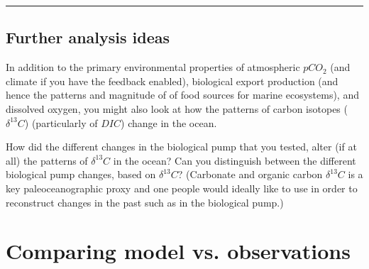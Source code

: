 \vspace{1mm} \noindent\rule{4cm}{0.5pt} \vspace{2mm}

\newpage

\subsection{Further analysis ideas}

\noindent In addition to the primary environmental properties of atmospheric \(pCO_{2}\) (and climate if you have the feedback enabled), biological export production (and hence the patterns and magnitude of of food sources for marine ecosystems), and dissolved oxygen, you might also look at how the patterns of carbon isotopes (\(\delta^{13}C\)) (particularly of \(DIC\)) change in the ocean. 

How did the different changes in the biological pump that you tested, alter (if at all) the patterns of \(\delta^{13}C\) in the ocean? Can you distinguish between the different biological pump changes, based on \(\delta^{13}C\)? (Carbonate and organic carbon \(\delta^{13}C\) is a key paleoceanographic proxy and one people would ideally like to use in order to reconstruct changes in the past such as in the biological pump.)

\newpage

\section{Comparing model vs. observations}

